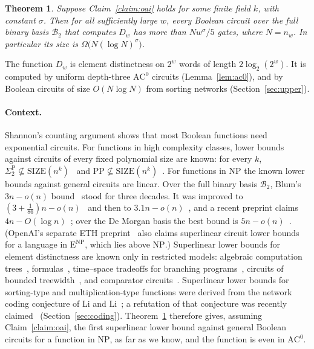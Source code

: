 \documentclass[11pt]{article}
\newtheorem{theorem}{Theorem}[section]
\theoremstyle{definition}
\newcommand{\Dw}{D_w}
\newcommand{\B}{\mathcal{B}_2}
\begin{document}
\begin{theorem}\label{thm:main}
Suppose Claim~\ref{claim:oai} holds for some finite field $k$, with constant $\sigma$. Then for all sufficiently large $w$, every Boolean circuit over the full binary basis $\B$ that computes $\Dw$ has more than $N w^{\sigma}/5$ gates, where $N=n_w$. In particular its size is $\Omega\bigl(N(\log N)^{\sigma}\bigr)$.
\end{theorem}

The function $\Dw$ is element distinctness on $2^w$ words of length $2\log_2(2^w)$. It is computed by uniform depth-three $\mathrm{AC}^0$ circuits (Lemma~\ref{lem:ac0}), and by Boolean circuits of size $O(N\log N)$ from sorting networks (Section~\ref{sec:upper}).

\paragraph{Context.} Shannon's counting argument shows that most Boolean functions need exponential circuits. For functions in high complexity classes, lower bounds against circuits of every fixed polynomial size are known: for every $k$, $\Sigma_2^{\mathrm P}\not\subseteq \mathrm{SIZE}(n^k)$~\cite{Kan82} and $\mathrm{PP}\not\subseteq\mathrm{SIZE}(n^k)$~\cite{Vin05}. For functions in $\mathrm{NP}$ the known lower bounds against general circuits are linear. Over the full binary basis $\B$, Blum's $3n-o(n)$ bound~\cite{Blum84} stood for three decades. It was improved to $(3+\tfrac1{86})n-o(n)$~\cite{FGHK16} and then to $3.1n-o(n)$~\cite{LY22}, and a recent preprint claims $4n-O(\log n)$~\cite{MS26}; over the De Morgan basis the best bound is $5n-o(n)$~\cite{IM02}. (OpenAI's separate ETH preprint~\cite{OAI-ETH} also claims superlinear circuit lower bounds for a language in $\mathrm{E}^{\mathrm{NP}}$, which lies above $\mathrm{NP}$.) Superlinear lower bounds for element distinctness are known only in restricted models: algebraic computation trees~\cite{BenOr83}, formulas~\cite{Nec66}, time--space tradeoffs for branching programs~\cite{Yao94,BSSV03}, circuits of bounded treewidth~\cite{dOO16}, and comparator circuits~\cite{GR20}. Superlinear lower bounds for sorting-type and multiplication-type functions were derived from the network coding conjecture of Li and Li~\cite{LL04,FHLS19,AFKL19,ALS21}; a refutation of that conjecture was recently claimed~\cite{ZLL26} (Section~\ref{sec:coding}). Theorem~\ref{thm:main} therefore gives, assuming Claim~\ref{claim:oai}, the first superlinear lower bound against general Boolean circuits for a function in $\mathrm{NP}$, as far as we know, and the function is even in $\mathrm{AC}^0$.
\end{document}

